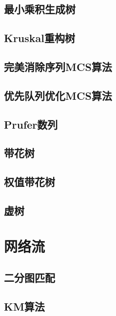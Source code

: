 \documentclass{article}
\begin{document}
\subsection{最小乘积生成树} 

\subsection{Kruskal重构树} 


\subsection{完美消除序列MCS算法} 

\subsection{优先队列优化MCS算法} 


\subsection{Prufer数列} 


\subsection{带花树} 

\subsection{权值带花树} 

\subsection{虚树} 



\newpage %
\section{网络流} %
\subsection{二分图匹配} 

\subsection{KM算法} 

\end{document}
